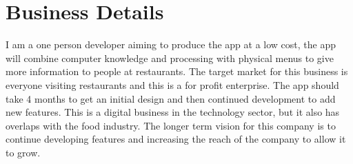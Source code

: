 \documentclass{article}[18pt]
\begin{document}
\section{Business Details}
I am a one person developer aiming to produce the app at a low cost, the app will combine computer knowledge and processing with physical menus to give more information to people at restaurants. The target market for this business is everyone visiting restaurants and this is a for profit enterprise. The app should take 4 months to get an initial design and then continued development to add new features. This is a digital business in the technology sector, but it also has overlaps with the food industry. The longer term vision for this company is to continue developing features and increasing the reach of the company to allow it to grow.
\end{document}
